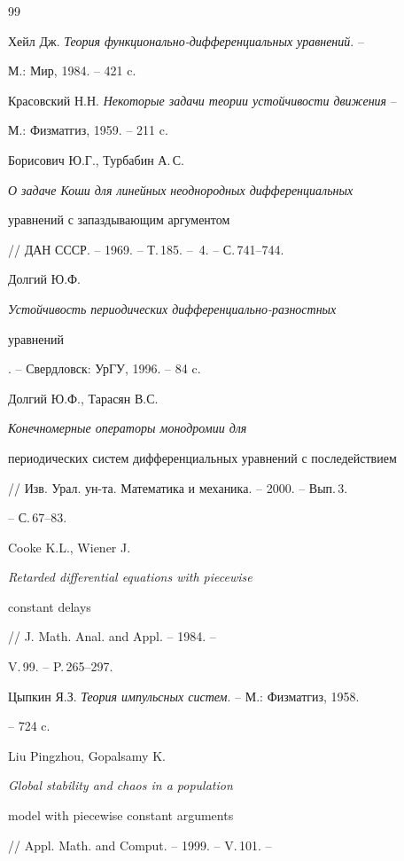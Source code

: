 \begin{thebibliography}{99}







Хейл Дж. {\it Теория функционально-дифференциальных уравнений}. --


М.: Мир, 1984. -- 421 c.




Красовский Н.Н. {\it Некоторые задачи теории устойчивости движения} --


М.: Физматгиз, 1959. -- 211 c.




Борисович Ю.Г., Турбабин А.\,С.


{\it О задаче Коши для линейных неоднородных дифференциальных


уравнений с запаздывающим аргументом}


// ДАН СССР. -- 1969. -- Т.\,185. -- \No\,4. -- С.\,741--744.




Долгий Ю.Ф. {\it Устойчивость периодических дифференциально-разностных


уравнений}. -- Свердловск: УрГУ, 1996. -- 84 c.




Долгий Ю.Ф., Тарасян В.С. {\it Конечномерные операторы монодромии для


периодических систем дифференциальных уравнений с последействием}


// Изв. Урал. ун-та. Математика и механика. -- 2000. -- Вып.\,3.


-- С.\,67--83.




Cooke K.L., Wiener J. {\it Retarded differential equations with piecewise


constant delays} // J. Math. Anal. and Appl. -- 1984. --


V.\,99. -- P.\,265--297.




Цыпкин Я.З. {\it Теория импульсных систем}. -- М.: Физматгиз, 1958.


-- 724 c.




Liu Pingzhou, Gopalsamy K. {\it Global stability and chaos in a population 


model with piecewise constant arguments}


// Appl. Math. and Comput. -- 1999. -- V.\,101. --



\end{thebibliography}
